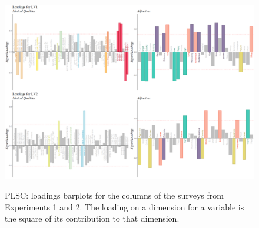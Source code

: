 \documentclass[
]{article}
\begin{document}
\begin{figure}   
  \centering  
  \caption{PLSC: loadings barplots for the columns of the surveys from Experiments 1 and 2. The loading on a dimension for a variable is the square of its contribution to that dimension.}
    \includegraphics{./supmatsimgs/ploads.png}
  \label{fig:ploads}
\end{figure}
\end{document}
